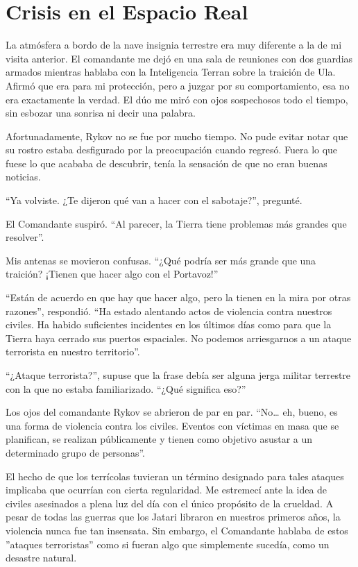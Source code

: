 \chapter{Crisis en el Espacio Real}\label{sec:crisis-en-el-espacio-real}

La atmósfera a bordo de la nave insignia terrestre era muy diferente a la de mi visita anterior. El comandante me dejó en una sala de reuniones con dos guardias armados mientras hablaba con la Inteligencia Terran sobre la traición de Ula. Afirmó que era para mi protección, pero a juzgar por su comportamiento, esa no era exactamente la verdad. El dúo me miró con ojos sospechosos todo el tiempo, sin esbozar una sonrisa ni decir una palabra.

Afortunadamente, Rykov no se fue por mucho tiempo. No pude evitar notar que su rostro estaba desfigurado por la preocupación cuando regresó. Fuera lo que fuese lo que acababa de descubrir, tenía la sensación de que no eran buenas noticias.

``Ya volviste. ¿Te dijeron qué van a hacer con el sabotaje?'', pregunté.

El Comandante suspiró. ``Al parecer, la Tierra tiene problemas más grandes que resolver''.

Mis antenas se movieron confusas. ``¿Qué podría ser más grande que una traición? ¡Tienen que hacer algo con el Portavoz!''

``Están de acuerdo en que hay que hacer algo, pero la tienen en la mira por otras razones'', respondió. ``Ha estado alentando actos de violencia contra nuestros civiles. Ha habido suficientes incidentes en los últimos días como para que la Tierra haya cerrado sus puertos espaciales. No podemos arriesgarnos a un ataque terrorista en nuestro territorio''.

``¿Ataque terrorista?'', supuse que la frase debía ser alguna jerga militar terrestre con la que no estaba familiarizado. ``¿Qué significa eso?''

Los ojos del comandante Rykov se abrieron de par en par. ``No… eh, bueno, es una forma de violencia contra los civiles. Eventos con víctimas en masa que se planifican, se realizan públicamente y tienen como objetivo asustar a un determinado grupo de personas''.

El hecho de que los terrícolas tuvieran un término designado para tales ataques implicaba que ocurrían con cierta regularidad. Me estremecí ante la idea de civiles asesinados a plena luz del día con el único propósito de la crueldad. A pesar de todas las guerras que los Jatari libraron en nuestros primeros años, la violencia nunca fue tan insensata. Sin embargo, el Comandante hablaba de estos ''ataques terroristas'' como si fueran algo que simplemente sucedía, como un desastre natural.

